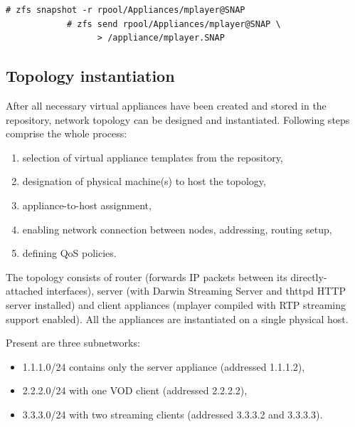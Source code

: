 \documentclass[11pt]{book}
\begin{document}
        \noindent
        \begin{minipage}{\textwidth}
          \begin{lstlisting}[caption={Publishing a snapshot in NFS repository},label={lst:uc:prep:snap}]
            # zfs snapshot -r rpool/Appliances/mplayer@SNAP
            # zfs send rpool/Appliances/mplayer@SNAP \
                  > /appliance/mplayer.SNAP
          \end{lstlisting}
        \end{minipage}


      \subsection{Topology instantiation}
      \label{ssub:}

        After all necessary virtual appliances have been created and stored in the repository, network topology can be
        designed and instantiated. Following steps comprise the whole process:

        \begin{enumerate}
          \item selection of virtual appliance templates from the repository,
          \item designation of physical machine(s) to host the topology,
          \item appliance-to-host assignment,
          \item enabling network connection between nodes, addressing, routing setup,
          \item defining QoS policies.
        \end{enumerate}

        The topology consists of router (forwards IP packets between its directly-attached interfaces), server (with
        Darwin Streaming Server and thttpd HTTP server installed) and client appliances (mplayer compiled with RTP
        streaming support enabled). All the appliances are instantiated on a single physical host.

        Present are three subnetworks:

        \begin{itemize}
          \item 1.1.1.0/24 contains only the server appliance (addressed 1.1.1.2),
          \item 2.2.2.0/24 with one VOD client (addressed 2.2.2.2),
          \item 3.3.3.0/24 with two streaming clients (addressed 3.3.3.2 and 3.3.3.3).
        \end{itemize}
\end{document}
